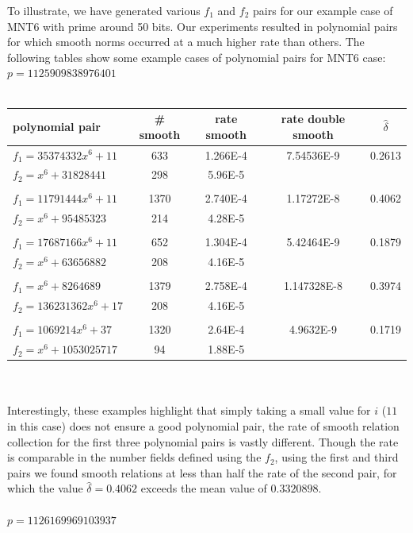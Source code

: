 \documentclass[a4paper, 12pt, envcountsect, runningheads]{llncs}
\numberwithin{figure}{section}
\numberwithin{equation}{section}
\begin{document}
To illustrate, we have generated various $f_1$ and $f_2$ pairs for our example case of MNT6 with prime around 50 bits. Our experiments resulted in polynomial pairs for which smooth norms occurred at a much higher rate than others. The following tables show some example cases of polynomial pairs for MNT6 case:\\
\newpage
\noindent$p=1125909838976401$\\\\
\begin{tabular}{l|cccc}
polynomial pair & \# smooth & rate smooth & rate double smooth & $\hat{\delta}$\\
\hline
$f_1=35374332x^6+11$ &633&1.266E-4&7.54536E-9&0.2613\\
$f_2=x^6+31828441$ &298&5.96E-5&&\\
&&&&\\
$f_1=11791444x^6+11$ &1370&2.740E-4&1.17272E-8&0.4062\\
$f_2=x^6+95485323$ &214&4.28E-5&&\\
&&&&\\
$f_1=17687166x^6+11$ &652&1.304E-4&5.42464E-9&0.1879\\
$f_2=x^6+63656882$ &208&4.16E-5&&\\
&&&&\\
$f_1=x^6+8264689$ &1379&2.758E-4&1.147328E-8&0.3974\\
$f_2=136231362x^6+17$ &208&4.16E-5&&\\
&&&&\\
$f_1=1069214x^6+37$ &1320&2.64E-4&4.9632E-9&0.1719\\
$f_2=x^6+1053025717$ &94&1.88E-5&&
\end{tabular}\\\\
Interestingly, these examples highlight that simply taking a small value for $i$ ($11$ in this case) does not ensure a good polynomial pair, the rate of smooth relation collection for the first three polynomial pairs is vastly different. Though the rate is comparable in the number fields defined using the $f_2$, using the first and third pairs we found smooth relations at less than half the rate of the second pair, for which the value $\hat{\delta}=0.4062$ exceeds the mean value of $0.3320898$.\\\\
$p=1126169969103937$\\\\
\end{document}
